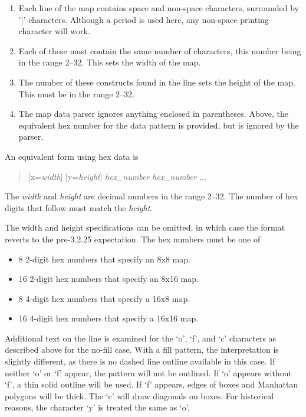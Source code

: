 \begin{description}
\begin{enumerate}
\item{Each line of the map contains space and non-space characters,
surrounded by '{\vt |}' characters.  Although a period is used here,
any non-space printing character will work.}

\item{Each of these must contain the same number of characters, this
number being in the range 2--32.  This sets the width of the map.}

\item{The number of these constructs found in the line sets the height
of the map.  This must be in the range 2--32.}

\item{The map data parser ignores anything enclosed in parentheses. 
Above, the equivalent hex number for the data pattern is provided, but
is ignored by the parser.}
\end{enumerate}

An equivalent form using hex data is

\begin{quote}
    [{\vt x=}{\it width\/}] [{\vt y=}{\it height\/}] {\it hex\_number}
      {\it hex\_number} ...
\end{quote}

The {\it width} and {\it height} are decimal numbers in the range
2--32.  The number of hex digits that follow must match the {\it
height\/}.

The width and height specifications can be omitted, in which case the
format reverts to the pre-3.2.25 expectation.  The hex numbers must be
one of
\begin{itemize}
\item{8 2-digit hex numbers that specify an 8x8 map.}
\item{16 2-digit hex numbers that specify an 8x16 map.}
\item{8 4-digit hex numbers that specify a 16x8 map.}
\item{16 4-digit hex numbers that specify a 16x16 map.}
\end{itemize}

Additional text on the line is examined for the `{\vt o}', `{\vt f}',
and `{\vt c}' characters as described above for the no-fill case. 
With a fill pattern, the interpretation is slightly different, as
there is no dashed line outline available in this case.  If neither
`{\vt o}' or `{\vt f}' appear, the pattern will not be outlined.  If
`{\vt o}' appears without `{\vt f}', a thin solid outline will be
used.  If `{\vt f}' appears, edges of boxes and Manhattan polygons
will be thick.  The `{\vt c}' will draw diagonals on boxes.  For
historical reasons, the character `{\vt y}' is treated the same as
`{\vt o}'.


\end{description}
